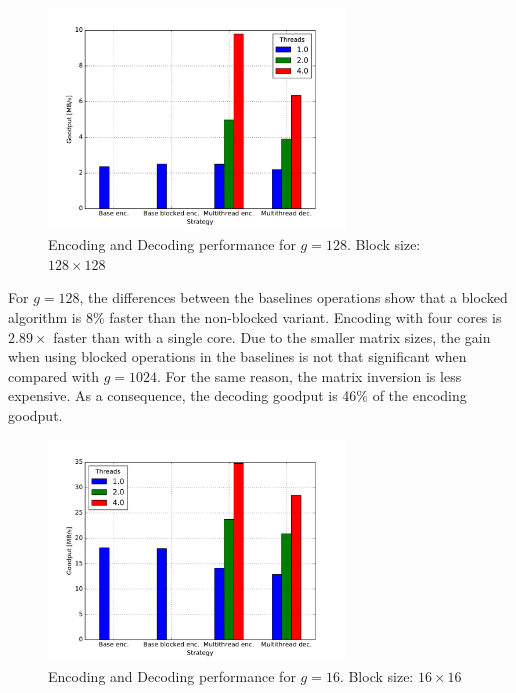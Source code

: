 \begin{figure}[ht!]
\centering
\includegraphics[width=0.7\textwidth]{images/GenSize_128_SymbolSize_1536.pdf}
\caption{Encoding and Decoding performance for $g = 128$. Block size: $128 \times 128$}
\label{enc_dec128}
\end{figure}

For $g = 128$, the differences between the baselines operations show that a
blocked algorithm is 8\% faster than the non-blocked variant. Encoding with
four cores is $2.89\times$ faster than with a single core. Due to the smaller
matrix sizes, the gain when using blocked operations in the baselines is not
that significant when compared with $g = 1024$. For the same reason, the matrix
inversion is less expensive. As a consequence, the decoding goodput is 46\%
of the encoding goodput.

\begin{figure}[ht!]
\centering
\includegraphics[width=0.7\textwidth]{images/GenSize_16_SymbolSize_1536.pdf}
\caption{Encoding and Decoding performance for $g = 16$. Block size: $16 \times 16$}
\label{enc_dec16}
\end{figure}

